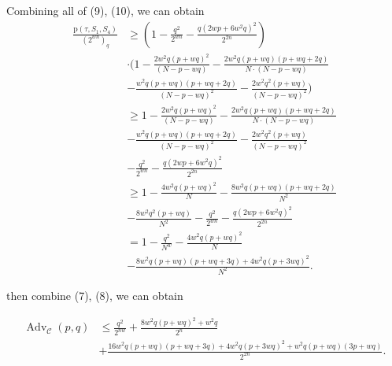 Combining all of (9), (10), we can obtain
$$
\begin{aligned}
\frac{\mathrm{p}\left(\tau, S_{1}, S_{4}\right)}{\left(2^{w n}\right)_{q}} &\geq (1-\frac{q^{2}}{2^{w n}}-\frac{q\left(2 w p+6 w^{2} q\right)^{2}}{2^{2 n}})\\
&\cdot (1- \frac{2 w^{2} q (p+w q)^{2}}{(N-p-w q)} -\frac{2 w^{2} q (p+w q)(p+w q+2 q)}{N \cdot (N-p-w q)}\\
&- \frac{w^{2} q (p+w q)(p+w q+2 q)}{(N-p-w q)^2} - \frac{2 w^{2} q^{2} (p+w q)}{(N- p- wq)^2})\\
&\geq 1- \frac{2 w^{2} q (p+w q)^{2}}{(N-p-w q)} -\frac{2 w^{2} q (p+w q)(p+w q+2 q)}{N \cdot (N-p-w q)}\\
&- \frac{w^{2} q (p+w q)(p+w q+2 q)}{(N-p-w q)^2} - \frac{2 w^{2} q^{2} (p+w q)}{(N- p- wq)^2}\\
& -\frac{q^{2}}{2^{w n}}-\frac{q\left(2 w p+6 w^{2} q\right)^{2}}{2^{2 n}}\\
&\geq 1- \frac{4 w^2 q(p+wq)^2}{N} - \frac{8 w^2 q(p+w q)(p+w q +2 q)}{N^2}\\
&- \frac{8 w^2 q^2(p+w q)}{N^2} - \frac{q^{2}}{2^{w n}}-\frac{q\left(2 w p+6 w^{2} q\right)^{2}}{2^{2 n}}\\
&= 1 - \frac{q^2}{N^w} - \frac{4 w^2 q(p+wq)^2}{N}\\
&- \frac{8 w^2 q(p+w q)(p+w q +3 q)+4 w^2 q(p+3 wq)^2}{N^2}.
\end{aligned}
$$

\noindent then combine (7), (8), we can obtain

$$
\begin{aligned}
\operatorname{Adv}_{\mathcal{C}}\left(p, q\right) &\leq \frac{q^2}{2^{n w}} + \frac{8 w^2 q(p+wq)^2+w^2 q}{2^n}\\
&+ \frac{16 w^2 q(p+w q)(p+w q +3 q)+4 w^2 q(p+3 wq)^2+ w^2q(p+w q)(3p+w q)}{2^{2 n}}.
\end{aligned}
$$




